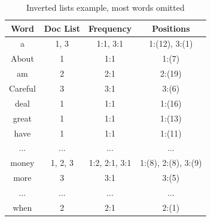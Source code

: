\begin{table}[ht]
    \begin{center}
        \begin{tabular}{|c|c|c|c|}
            \hline
            \textbf{Word} & \textbf{Doc List} & \textbf{Frequency} & \textbf{Positions} \\ \hline
            a & 1, 3 & 1:1, 3:1 & 1:(12), 3:(1) \\ \hline
            About & 1 & 1:1 & 1:(7) \\ \hline
            am & 2 & 2:1 & 2:(19) \\ \hline
            Careful & 3 & 3:1 & 3:(6) \\ \hline
            deal & 1 & 1:1 & 1:(16) \\ \hline
            great & 1 & 1:1 & 1:(13) \\ \hline
            have & 1 & 1:1 & 1:(11) \\ \hline
            ... & ... & ... & ... \\ \hline
            money & 1, 2, 3 & 1:2, 2:1, 3:1 & 1:(8), 2:(8), 3:(9) \\ \hline
            more & 3 & 3:1 & 3:(5) \\ \hline
            ... & ... & ... & ... \\ \hline
            when & 2 & 2:1 & 2:(1) \\ \hline
        \end{tabular}
        \caption{Inverted lists example, most words omitted\label{tab:inverted_lists}} 
    \end{center}
\end{table}


